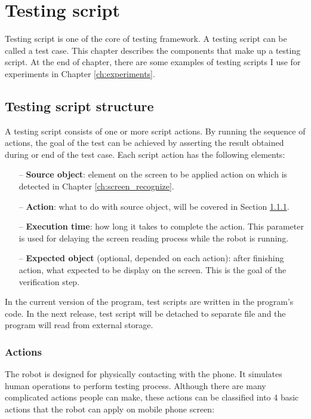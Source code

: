 \chapter{Testing script}
\label{ch:test_script}
Testing script is one of the core of testing framework.
A testing script can be called a test case.
This chapter describes the components that make up a testing script. At the end of chapter, there are some examples of testing scripts I use for experiments in Chapter \ref{ch:experiments}.

\section{Testing script structure}
\label{sec:script_comp}
A testing script consists of one or more script actions. By running the sequence of actions, the goal of the test can be achieved by asserting the result obtained during or end of the test case. Each script action has the following elements:
    \begin{itemize}
		\item[--] \textbf{Source object}: element on the screen to be applied action on which is detected in Chapter \ref{ch:screen_recognize}.
		\item[--] \textbf{Action}: what to do with source object, will be covered in Section \ref{sec:actions}.
		\item[--] \textbf{Execution time}: how long it takes to complete the action. This parameter is used for delaying the screen reading process while the robot is running.
		\item[--] \textbf{Expected object} (optional, depended on each action): after finishing action, what expected to be display on the screen. This is the goal of the verification step.
	\end{itemize}

In the current version of the program, test scripts are written in the program's code. In the next release, test script will be detached to separate file and the program will read from external storage.

\subsection{Actions}
\label{sec:actions}
The robot is designed for physically contacting with the phone. It simulates human operations to perform testing process.
Although there are many complicated actions people can make, these actions can be classified into 4 basic actions that the robot can apply on mobile phone screen:

